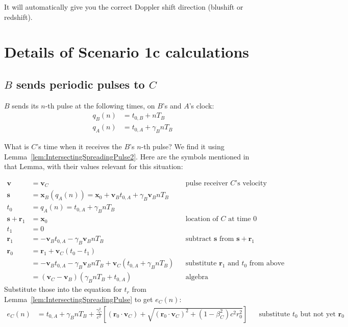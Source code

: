 \documentclass[a4paper]{article}
\theoremstyle{plain}
\theoremstyle{definition}
\newcommand{\vect}[1]{\mathbf{#1}}
\begin{document}
It will automatically give you the correct Doppler shift direction
(blushift or redshift).


\section{Details of Scenario 1c calculations}
\label{app:scen1c}


\subsection{$B$ sends periodic pulses to $C$}
\label{app:scen1c-Bsending}

$B$ sends its $n$-th pulse at the following times, on $B$'s and $A$'s
clock:
\begin{align}
q_B(n) & = t_{0,B} + nT_B \\
q_A(n) & = t_{0,A} + \gamma_B nT_B
\end{align}

What is $C$'s time when it receives the $B$'s $n$-th pulse?  We find
it using Lemma~\ref{lem:IntersectingSpreadingPulse2}.  Here are the
symbols mentioned in that Lemma, with their values relevant for this
situation:

\begin{align*}
\vect{v} & = \vect{v}_C & & \text{pulse receiver $C$'s velocity} \\
\vect{s} & = \vect{x}_B(q_A(n)) = \vect{x}_0 + \vect{v}_B t_{0,A} + \gamma_B \vect{v}_B n T_B  & & \text{} \\
t_0 & = q_A(n) = t_{0,A} + \gamma_B nT_B & & \text{} \\
\vect{s} + \vect{r}_1 & = \vect{x}_0 & & \text{location of $C$ at time 0} \\
t_1 & = 0 \\
\vect{r}_1 & = - \vect{v}_B t_{0,A} - \gamma_B \vect{v}_B n T_B & & \text{subtract $\vect{s}$ from $\vect{s}+\vect{r}_1$} \\
\vect{r}_0
  & = \vect{r}_1 + \vect{v}_C(t_0-t_1) \\
  & = - \vect{v}_B t_{0,A} - \gamma_B \vect{v}_B n T_B + \vect{v}_C (t_{0,A} + \gamma_B nT_B) & & \text{substitute $\vect{r}_1$ and $t_0$ from above} \\
  & = (\vect{v}_C - \vect{v}_B) (\gamma_B n T_B + t_{0,A}) & & \text{algebra}
\end{align*}
Substitute those into the equation for $t_r$ from
Lemma~\ref{lem:IntersectingSpreadingPulse} to get $e_{C}(n)$:
\begin{align*}
e_{C}(n) & = t_{0,A} + \gamma_B nT_B + \frac{\gamma_C^2}{c^2} \left[ (\vect{r}_0 \cdot \vect{v}_C) + \sqrt{(\vect{r}_0 \cdot \vect{v}_C)^2 + (1-\beta_C^2)c^2 r_0^2} \right] & & \text{substitute $t_0$ but not yet $\vect{r}_0$}
\end{align*}
\end{document}
